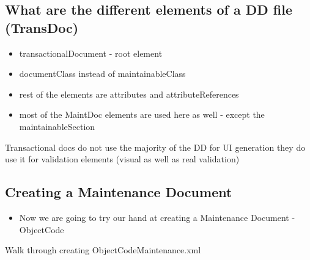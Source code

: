 \begin{ifhtml}
\begin{s5slide}
        \section{What are the different elements of a DD file (TransDoc)}
            \begin{itemize}
                \item transactionalDocument - root element
                \item documentClass instead of maintainableClass
                \item rest of the elements are attributes and attributeReferences
                \item most of the MaintDoc elements are used here as well - except the maintainableSection
            \end{itemize}
            \begin{s5notes}
                Transactional docs do not use the majority of the DD for UI generation they do use it for validation elements (visual as well as real validation)
            \end{s5notes}
    \end{s5slide}
    \begin{s5slide}
        \section{Creating a Maintenance Document}
            \begin{itemize}
                \item Now we are going to try our hand at creating a Maintenance Document - ObjectCode
            \end{itemize}
            \begin{s5notes}
                Walk through creating ObjectCodeMaintenance.xml
            \end{s5notes}
    \end{s5slide}
\end{ifhtml}